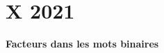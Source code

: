 \chapter{X 2021}
\vskip -2cm
\begin{center}
    \Huge \bf Facteurs dans les mots binaires
\end{center}
